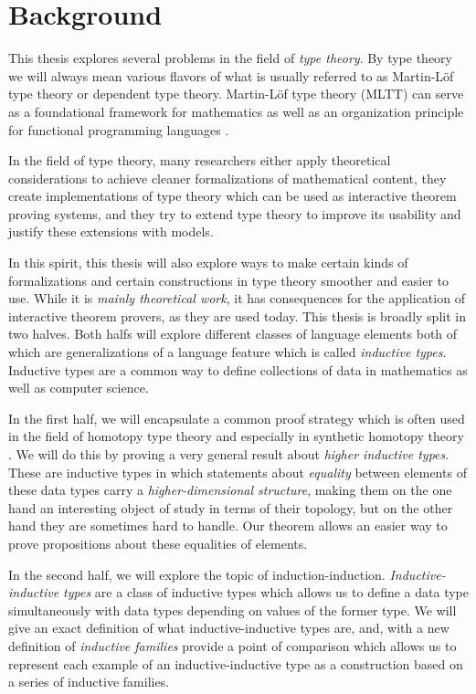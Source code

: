 \section{Background}

This thesis explores several problems in the field of \emph{type theory}.
By type theory we will always mean various flavors of what is usually
referred to as Martin-Löf type theory or dependent type theory.
Martin-Löf type theory (MLTT) can serve as a foundational framework for
mathematics as well as an organization principle for functional programming languages \citep{martin-lof2}.

In the field of type theory, many researchers either apply theoretical considerations
to achieve cleaner formalizations of mathematical content,
they create implementations of type theory which can be used as
interactive theorem proving systems, and they try to extend type
theory to improve its usability and justify these extensions with models.

In this spirit, this thesis will also explore ways to make certain kinds of formalizations
and certain constructions in type theory smoother and easier to use.
While it is \emph{mainly theoretical work}, it has consequences for the application of
interactive theorem provers, as they are used today.
This thesis is broadly split in two halves.
Both halfs will explore different classes of language elements both of which are generalizations
of a language feature which is
called \emph{inductive types}.
Inductive types are a common way to define collections of data in mathematics
as well as computer science.

In the first half, we will encapsulate a common proof strategy which
is often used in the field of homotopy type theory and especially in
synthetic homotopy theory \citep{hottbook}.
We will do this by
proving a very general result about \emph{higher inductive types}.
These are inductive types in which statements about \emph{equality} between
elements of these data types carry a \emph{higher-dimensional structure},
making them on the one hand an interesting object of study in terms of their topology,
but on the other hand they are sometimes hard to handle.
Our theorem allows an easier way to prove propositions about these
equalities of elements.

In the second half, we will explore the topic of induction-induction.
\emph{Inductive-inductive types} \citep{nordvallinductive}
are a class of inductive types which
allows us to define a data type simultaneously with data types depending on
values of the former type.
We will give an exact definition of what inductive-inductive types are,
and, with a new definition of \emph{inductive families} provide a point of
comparison which allows us to represent each example of
an inductive-inductive type as a construction based on a series of
inductive families.

